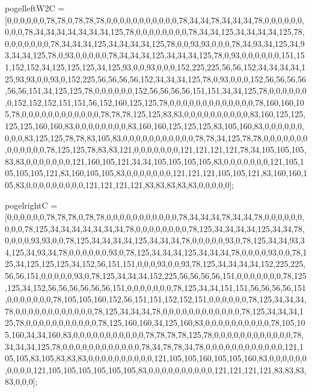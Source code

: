 pogelleftW2C = [0,0,0,0,0,0,78,78,0,78,78,78,0,0,0,0,0,0,0,0,0,0,0,78,34,34,78,34,34,34,78,0,0,0,0,0,0,0,0,0,78,34,34,34,34,34,34,34,125,78,0,0,0,0,0,0,0,0,78,34,34,125,34,34,34,34,125,78,0,0,0,0,0,0,0,78,34,34,34,125,34,34,34,34,125,78,0,0,93,93,0,0,0,78,34,93,34,125,34,93,34,34,125,78,0,93,0,0,0,0,0,78,34,34,34,125,34,34,34,125,78,0,93,0,0,0,0,0,0,151,151,152,152,34,125,125,125,34,125,93,0,0,93,0,0,0,152,225,225,56,56,152,34,34,34,34,125,93,93,0,0,93,0,152,225,56,56,56,56,152,34,34,34,125,78,0,93,0,0,0,152,56,56,56,56,56,56,151,34,125,125,78,0,0,0,0,0,0,152,56,56,56,56,151,151,34,34,125,78,0,0,0,0,0,0,0,152,152,152,151,151,56,152,160,125,125,78,0,0,0,0,0,0,0,0,0,0,0,0,0,78,160,160,105,78,0,0,0,0,0,0,0,0,0,0,0,0,78,78,78,125,125,83,83,0,0,0,0,0,0,0,0,0,0,83,160,125,125,125,125,160,160,83,0,0,0,0,0,0,0,0,83,160,160,125,125,125,83,105,160,83,0,0,0,0,0,0,0,0,0,83,125,125,78,78,83,105,83,0,0,0,0,0,0,0,0,0,0,0,78,78,34,125,78,78,0,0,0,0,0,0,0,0,0,0,0,0,0,78,125,125,78,83,83,121,0,0,0,0,0,0,0,121,121,121,121,78,34,105,105,105,83,83,0,0,0,0,0,0,0,121,160,105,121,34,34,105,105,105,105,83,0,0,0,0,0,0,0,121,105,105,105,105,121,83,160,105,105,83,0,0,0,0,0,0,0,121,121,121,105,105,121,83,160,160,105,83,0,0,0,0,0,0,0,0,0,121,121,121,121,83,83,83,83,83,0,0,0,0,0];

pogelrightC = [0,0,0,0,0,0,78,78,78,0,78,78,0,0,0,0,0,0,0,0,0,0,0,78,34,34,34,78,34,34,78,0,0,0,0,0,0,0,0,0,78,125,34,34,34,34,34,34,34,78,0,0,0,0,0,0,0,0,78,125,34,34,34,34,125,34,34,78,0,0,0,0,93,93,0,0,78,125,34,34,34,34,125,34,34,34,78,0,0,0,0,0,93,0,78,125,34,34,93,34,125,34,93,34,78,0,0,0,0,0,0,93,0,78,125,34,34,34,125,34,34,34,78,0,0,0,0,93,0,0,78,125,34,125,125,125,34,152,56,151,151,0,0,0,93,0,0,93,78,125,34,34,34,34,152,225,225,56,56,151,0,0,0,0,0,93,0,78,125,34,34,34,152,225,56,56,56,56,151,0,0,0,0,0,0,0,78,125,125,34,152,56,56,56,56,56,56,151,0,0,0,0,0,0,0,78,125,34,34,151,151,56,56,56,56,151,0,0,0,0,0,0,0,78,105,105,160,152,56,151,151,152,152,151,0,0,0,0,0,0,78,125,34,34,34,78,0,0,0,0,0,0,0,0,0,0,0,0,78,125,34,34,34,78,0,0,0,0,0,0,0,0,0,0,0,0,78,125,34,34,34,125,78,0,0,0,0,0,0,0,0,0,0,0,78,125,160,160,34,125,160,83,0,0,0,0,0,0,0,0,0,0,78,105,105,160,34,34,160,83,0,0,0,0,0,0,0,0,0,0,0,78,78,78,78,125,78,0,0,0,0,0,0,0,0,0,0,0,0,78,34,34,34,125,78,0,0,0,0,0,0,0,0,0,0,0,0,78,34,78,78,34,78,0,0,0,0,0,0,0,0,0,0,0,0,121,105,105,83,105,83,83,83,0,0,0,0,0,0,0,0,0,0,121,105,105,160,105,105,160,83,0,0,0,0,0,0,0,0,0,0,121,105,105,105,105,105,105,83,0,0,0,0,0,0,0,0,0,0,121,121,121,121,83,83,83,83,0,0,0];

